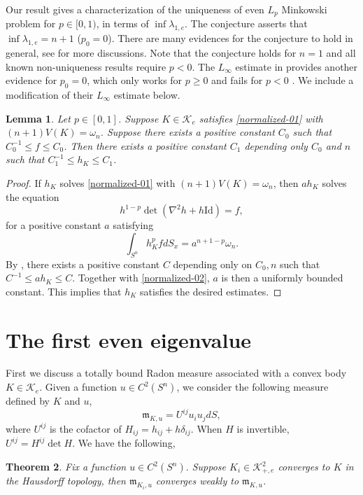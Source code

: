 \documentclass[reqno]{amsart}
\theoremstyle{remark}
\def\cK{{\mathcal K}}
\theoremstyle{plain}
\newtheorem{thm}{Theorem}
\newtheorem{lemma}[thm]{Lemma}
\begin{document}
Our result gives a characterization of the uniqueness of even $L_p$ Minkowski problem for $p\in [0, 1)$, in terms of $\inf \lambda_{1, e}$. 
The conjecture \cite[Section 5]{KM01} asserts that $\inf \lambda_{1, e}=n+1$ ($p_0=0$). 
There are many evidences for the conjecture to hold in general, see \cite{KM01, Milman23, B24} for more discussions. Note that the conjecture holds for $n=1$ \cite{BLYZ01} and all known non-uniqueness results require $p<0$.   The $L_\infty$ estimate in \cite{CHLL} provides another evidence for $p_0=0$, which only works for $p\geq 0$ and fails for $p<0$ \cite{JLW}. We include a modification of their $L_\infty$ estimate below. 
\begin{lemma}\cite[Lemma 2.1]{CHLL}
    Let $p\in [0, 1]$. Suppose $K\in \cK_e$ satisfies \eqref{normalized-01} with $(n+1)V(K)=\omega_n$. Suppose there exists a positive constant $C_0$ such that
    $C_0^{-1}\leq f\leq C_0$. Then there exists a positive constant $C_1$ depending only $C_0$ and $n$ such that
        $C_1^{-1}\leq h_K\leq C_1$.     
\end{lemma}
\begin{proof}
 If $h_K$ solves \eqref{normalized-01} with $(n+1)V(K)=\omega_n$, then $a h_K$ solves  the equation
    \[
    h^{1-p}\det(\nabla^2 h+h\text{Id})=f,
    \]
    for a positive constant $a$ satisfying 
    \begin{equation}\label{normalized-02}
        \int_{S^n} h_K^p fdS_x=a^{n+1-p} \omega_n.
    \end{equation}
    By \cite[Lemma 2.1]{CHLL}, there exists a positive constant $C$ depending only on $C_0, n$ such that $C^{-1}\leq a h_K\leq C$. Together with \eqref{normalized-02}, $a$ is then a uniformly bounded constant. This implies that $h_K$ satisfies the desired estimates. 
\end{proof}




\section{The first even eigenvalue}

First we discuss a totally bound Radon measure associated with a convex body $K\in \cK_e$. Given a function $u\in C^2(S^n)$, we consider the following measure 
defined by $K$ and $u$,
\[
\mathfrak{m}_{K, u}=U^{ij}u_iu_j dS,
\]
where $U^{ij}$ is the cofactor of $H_{ij}=h_{ij}+h\delta_{ij}$. When $H$ is invertible, $U^{ij}=H^{ij}\det{H}$. We have the following, 

\begin{thm}Fix a function $u\in C^2(S^n).$ Suppose $K_i\in\cK^2_{+, e}$ converges to $K$ in the Hausdorff topology, then $\mathfrak{m}_{K_i, u}$ converges weakly to $\mathfrak{m}_{K, u}$. 
\end{thm}
\end{document}
